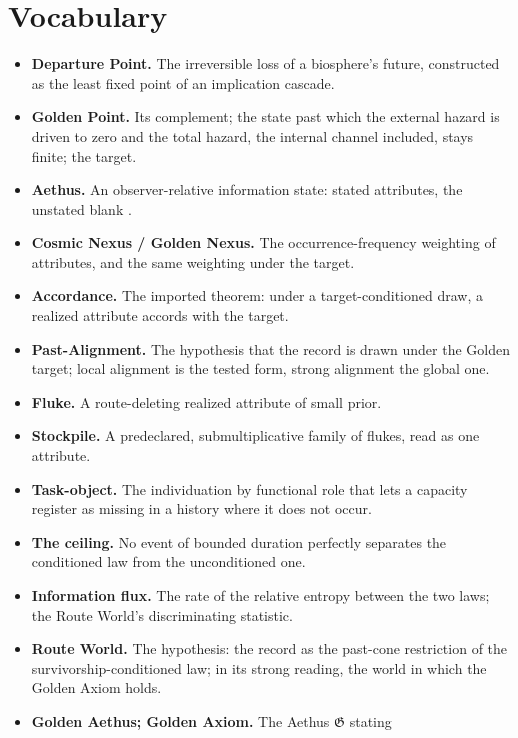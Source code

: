 \section{Vocabulary}\label{sec:vocab}
\begin{itemize}[itemsep=2pt]
\item \textbf{Departure Point.} The irreversible loss of a biosphere's
future, constructed as the least fixed point of an implication cascade.
\item \textbf{Golden Point.} Its complement; the state past which the
external hazard is driven to zero and the total hazard, the internal
channel included, stays finite; the target.
\item \textbf{Aethus.} An observer-relative information state: stated
attributes, the unstated blank \cite{Aethus}.
\item \textbf{Cosmic Nexus / Golden Nexus.} The occurrence-frequency
weighting of attributes, and the same weighting under the target.
\item \textbf{Accordance.} The imported theorem: under a target-conditioned
draw, a realized attribute accords with the target.
\item \textbf{Past-Alignment.} The hypothesis that the record is drawn under
the Golden target; local alignment is the tested form, strong alignment
the global one.
\item \textbf{Fluke.} A route-deleting realized attribute of small prior.
\item \textbf{Stockpile.} A predeclared, submultiplicative family of flukes,
read as one attribute.
\item \textbf{Task-object.} The individuation by functional role that lets a
capacity register as missing in a history where it does not occur.
\item \textbf{The ceiling.} No event of bounded duration perfectly separates
the conditioned law from the unconditioned one.
\item \textbf{Information flux.} The rate of the relative entropy between
the two laws; the Route World's discriminating statistic.
\item \textbf{Route World.} The hypothesis: the record as the past-cone
restriction of the survivorship-conditioned law; in its strong reading,
the world in which the Golden Axiom holds.
\item \textbf{Golden Aethus; Golden Axiom.} The Aethus $\mathfrak G$ stating

\end{itemize}

